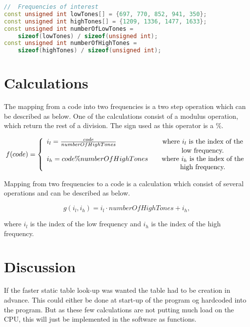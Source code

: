 	\begin{lstlisting}[float=htb,language={C++},caption={Implementation of tone arrays},label={app_dtmf:tone_array_listing}]
//	Frequencies of interest
const unsigned int lowTones[] = {697, 770, 852, 941, 350};
const unsigned int highTones[] = {1209, 1336, 1477, 1633};
const unsigned int numberOfLowTones =
	sizeof(lowTones) / sizeof(unsigned int);
const unsigned int numberOfHighTones =
	sizeof(highTones) / sizeof(unsigned int);
	\end{lstlisting}
	
	\section{Calculations}
	The mapping from a code into two frequencies is a two step operation which can be described as below. One of the calculations consist of a modulus operation, which return the rest of a division. The sign used as this operator is a \%.
	
	\[
		f(code) = \left\{ 
		\begin{array}{l c}
			i_{l} = \frac{code}{numberOfHighTones} & \quad \text{where $i_{l}$ is the index of the}\\
			& \quad \text{low frequency.}\\
			i_{h} = code \% numberOfHighTones & \quad \text{where $i_{h}$ is the index of the}\\
						& \quad \text{high frequency.}\\
		\end{array} \right.
	\]
	
	Mapping from two frequencies to a code is a calculation which consist of several operations and can be described as below.
	
	\[
		g(i_{l}, i_{h}) = i_{l} \cdot numberOfHighTones + i_{h},
	\]
	
	where $i_{l}$ is the index of the low frequency and $i_{h}$ is the index of the high frequency.
	
	\section{Discussion}
	If the faster static table look-up was wanted the table had to be creation in advance. This could either be done at start-up of the program og hardcoded into the program. But as these few calculations are not putting much load on the CPU, this will just be implemented in the software as functions.